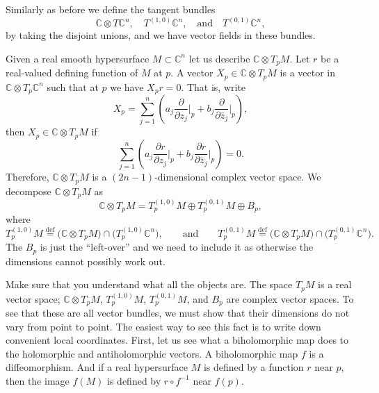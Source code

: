 \documentclass[12pt,openany]{book}
\newcommand{\C}{{\mathbb{C}}}
\theoremstyle{plain}
\theoremstyle{remark}
\theoremstyle{definition}
\theoremstyle{exercise}
\theoremstyle{example}
\begin{document}
Similarly as before we define the tangent bundles
\begin{equation*}
\C \otimes T\C^n,
\quad
T^{(1,0)} \C^n,
\quad \text{and} \quad
T^{(0,1)} \C^n ,
\end{equation*}
by taking the disjoint unions, and we have vector fields in these bundles.

Given a real smooth hypersurface $M \subset \C^n$ let us describe
$\C \otimes T_pM$.  Let $r$ be a real-valued defining function of
$M$ at $p$.  A vector $X_p \in \C \otimes T_pM$
is a vector in $\C \otimes T_p\C^n$ such that at $p$ we have
$X_p r = 0$.  That is,
write
\begin{equation*}
X_p = \sum_{j=1}^n
\left(
a_j 
\frac{\partial}{\partial z_j} \Big|_p
+
b_j
\frac{\partial}{\partial \bar{z}_j} \Big|_p
\right),
\end{equation*}
then $X_p \in \C \otimes T_p M$
if
\begin{equation*}
 \sum_{j=1}^n
\left(
a_j 
\frac{\partial r}{\partial z_j} \Big|_p
+
b_j
\frac{\partial r}{\partial \bar{z}_j} \Big|_p
\right)
= 0 .
\end{equation*}
Therefore, $\C \otimes T_p M$ is a $(2n-1)$-dimensional complex vector space.
We decompose 
$\C \otimes T_p M$ as
\begin{equation*}
\C \otimes T_pM = 
T_p^{(1,0)} M \oplus T_p^{(0,1)} M \oplus B_p ,
\end{equation*}
where
\begin{equation*}
T_p^{(1,0)} M \overset{\text{def}}{=} \bigl( \C \otimes T_pM \bigr) \cap
\bigl( T_p^{(1,0)} \C^n \bigr),  \qquad \text{and}
\qquad
T_p^{(0,1)} M \overset{\text{def}}{=} \bigl( \C \otimes T_pM \bigr) \cap
\bigl( T_p^{(0,1)} \C^n \bigr) .
\end{equation*}
The $B_p$ is just the ``left-over'' and we need to
include it as otherwise the dimensions cannot possibly work out.

Make sure that you understand what all the objects are.  The space
$T_pM$ is a real vector space; $\C \otimes T_pM$, $T_p^{(1,0)}M$,
$T_p^{(0,1)} M$, and $B_p$ are complex vector spaces.  To see that
these are all vector bundles, we must show that their dimensions do not vary
from point to point.  The easiest way to see this fact is to write down
convenient local coordinates.  First, let us see what a biholomorphic map
does to the holomorphic and antiholomorphic vectors.  A biholomorphic map
$f$ is a diffeomorphism.  And if a real hypersurface $M$ is defined
by a function $r$ near $p$, then the image $f(M)$ is defined by
$r \circ f^{-1}$ near $f(p)$.
\end{document}
